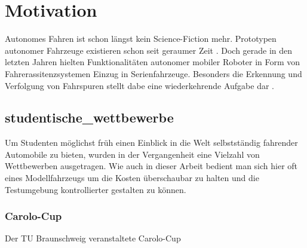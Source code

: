 \section{Motivation}
Autonomes Fahren ist schon längst kein Science-Fiction mehr. Prototypen autonomer Fahrzeuge existieren schon seit geraumer Zeit \autocite{AutonomesFahrenSeit}. Doch gerade in den letzten Jahren hielten Funktionalitäten autonomer mobiler Roboter in Form von Fahrerassitenzsystemen Einzug in Serienfahrzeuge. Besonders die Erkennung und Verfolgung von Fahrspuren stellt dabe eine wiederkehrende Aufgabe dar \autocite{guldeSpurhalteassistentenImTest2014}.
\subsection{studentische_wettbewerbe}
Um Studenten möglichst früh einen Einblick in die Welt selbstständig fahrender Automobile zu bieten, wurden in der Vergangenheit eine Vielzahl von Wettbewerben ausgetragen. Wie auch in dieser Arbeit bedient man sich hier oft eines Modellfahrzeugs um die Kosten überschaubar zu halten und die Testumgebung kontrollierter gestalten zu können.
\subsubsection{Carolo-Cup}
Der TU Braunschweig veranstaltete Carolo-Cup 